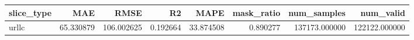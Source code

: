 \begin{tabular}{lrrrrrrr}
\toprule
slice_type & MAE & RMSE & R2 & MAPE & mask_ratio & num_samples & num_valid \\
\midrule
urllc & 65.330879 & 106.002625 & 0.192664 & 33.874508 & 0.890277 & 137173.000000 & 122122.000000 \\
\bottomrule
\end{tabular}
